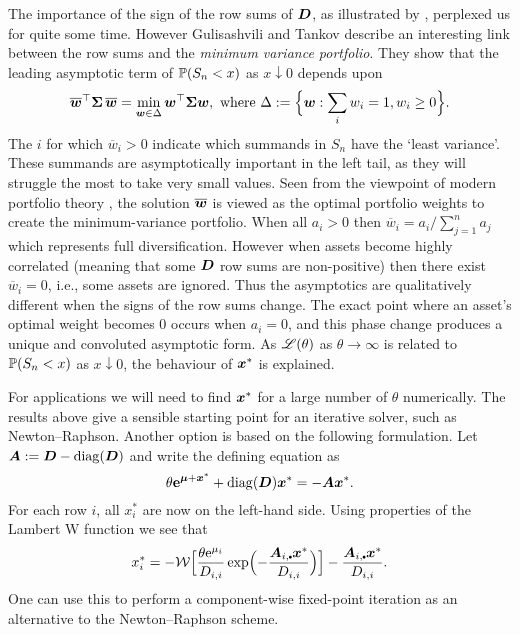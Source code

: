 \begin{remark}\label{Rem:25.8b} \rm The importance of the sign of the row sums of
  $\bm{D}$, as illustrated by , perplexed us for
  quite some time. However Gulisashvili and Tankov \cite{tankov2015tail}
  describe an interesting link between the row sums and the \emph{minimum
    variance portfolio}. They show that the leading asymptotic term of
  $\operatorname{{\mathbb P}}(S_n < x)$ as $x \downarrow 0$ depends upon
%
\[ \overline{\bm{w}}^\top \bm{\Sigma} \, \overline{\bm{w}}
 = \min_{\bm{w} \in \Delta} \bm{w}^\top \bm{\Sigma}  \bm{w} , \text{ where }
\Delta := \Bigl\{ \bm{w} : \sum_i w_i = 1, w_i \geq 0 \Bigr\} . \]
%
The $i$ for which $\overline{w}_i > 0$ indicate which summands in $S_n$ have
the `least variance'. These summands are asymptotically important in the left
tail, as they will struggle the most to take very small values. Seen from the
viewpoint of modern portfolio theory \cite{markowitz1952portfolio}, the
solution $\overline{\bm{w}}$ is viewed as the optimal portfolio weights to
create the minimum-variance portfolio. When all $a_i > 0$ then $\overline{w}_i
= a_i / \sum_{j=1}^n a_j$ which represents full diversification. However when
assets become highly correlated (meaning that some $\bm{D}$ row sums are
non-positive) then there exist $\overline{w}_i = 0$, i.e., some assets are
ignored. Thus the asymptotics are qualitatively different when the signs of
the row sums change. The exact point where an asset's optimal weight becomes 0
occurs when $a_i = 0$, and this phase change produces a unique and convoluted
asymptotic form. As $\mathscr{L}(\theta)$ as $\theta \to \infty$ is related to
$\operatorname{{\mathbb P}}(S_n < x)$ as $x \downarrow 0$, the behaviour of $\bm{x}^*$ is
explained. \remQED
\end{remark}

For applications we will need to find $\bm{x}^*$ for a large number of $\theta$
numerically. The results above give a sensible starting point for an iterative
solver, such as Newton--Raphson. Another option is based on the following
formulation. Let $\bm{A} := \bm{D} - \mathrm{diag}(\bm{D})$ and write the defining
equation as
%
\[ \theta \text{\bf{e}}^{\bm{\mu} + \bm{x}^*} + \mathrm{diag}(\bm{D})  \bm{x}^* = - \bm{A} \bm{x}^* . \]
%
For each row $i$, all $x_i^*$ are now on the left-hand side. Using properties
of the Lambert W function we see that
%
\[ x_i^* = -\LambertW \Bigl[ \frac{\theta \e^{\mu_i}}{D_{i,i}}
 \exp\Bigl( - \frac{\bfA_{i,\sbullet} \bfx^*}{D_{i,i}} \Bigr) \Bigr] -
 \frac{\bfA_{i,\sbullet} \bfx^*}{D_{i,i}} . \] One can use this to perform a
 component-wise fixed-point iteration as an alternative to the Newton--Raphson
 scheme.

